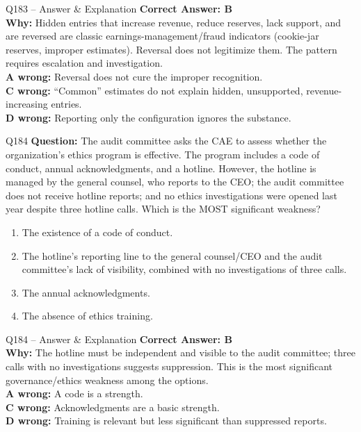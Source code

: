 \documentclass[aspectratio=169,10pt]{beamer}
\begin{document}
	\begin{frame}[t]{Q183 -- Answer \& Explanation}
		\small
		\textbf{Correct Answer: B} \\[4pt]
		\textbf{Why:} Hidden entries that increase revenue, reduce reserves, lack support, and are reversed are classic earnings-management/fraud indicators (cookie-jar reserves, improper estimates). Reversal does not legitimize them. The pattern requires escalation and investigation. \\[4pt]
		\textbf{A wrong:} Reversal does not cure the improper recognition. \\[2pt]
		\textbf{C wrong:} ``Common'' estimates do not explain hidden, unsupported, revenue-increasing entries. \\[2pt]
		\textbf{D wrong:} Reporting only the configuration ignores the substance.
	\end{frame}
	
	\begin{frame}[t]{Q184}
		\small
		\textbf{Question:} The audit committee asks the CAE to assess whether the organization's ethics program is effective. The program includes a code of conduct, annual acknowledgments, and a hotline. However, the hotline is managed by the general counsel, who reports to the CEO; the audit committee does not receive hotline reports; and no ethics investigations were opened last year despite three hotline calls. Which is the MOST significant weakness?
		\begin{enumerate}[label=\Alph*.,itemsep=1pt,topsep=2pt]
			\item The existence of a code of conduct.
			\item The hotline's reporting line to the general counsel/CEO and the audit committee's lack of visibility, combined with no investigations of three calls.
			\item The annual acknowledgments.
			\item The absence of ethics training.
		\end{enumerate}
	\end{frame}
	
	\begin{frame}[t]{Q184 -- Answer \& Explanation}
		\small
		\textbf{Correct Answer: B} \\[4pt]
		\textbf{Why:} The hotline must be independent and visible to the audit committee; three calls with no investigations suggests suppression. This is the most significant governance/ethics weakness among the options. \\[4pt]
		\textbf{A wrong:} A code is a strength. \\[2pt]
		\textbf{C wrong:} Acknowledgments are a basic strength. \\[2pt]
		\textbf{D wrong:} Training is relevant but less significant than suppressed reports.
	\end{frame}
	
\end{document}
